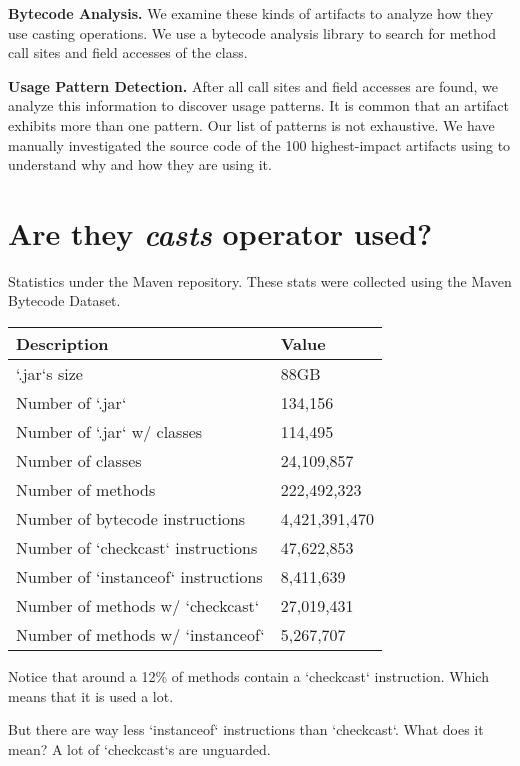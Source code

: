 \textbf{Bytecode Analysis.} 
We examine these kinds of artifacts to analyze how they use casting operations. 
We use a bytecode analysis library to search for method call sites and field accesses of the \smu{} class. 

\textbf{Usage Pattern Detection.} 
After all call sites and field accesses are found, we analyze this information to discover usage patterns. 
It is common that an artifact exhibits more than one pattern. 
Our list of patterns is not exhaustive.  
We have manually investigated the source code of the 100 highest-impact artifacts using \smu{} to understand why and how they are using it. 

\section{Are they \emph{casts} operator used? \label{orgb0b4e0e}}
\label{sec:orgb1d0eea}

Statistics under the Maven repository. 
These stats were collected using the Maven Bytecode Dataset. 

\begin{center}
\begin{tabular}{ll}
Description & Value\\
\hline
`.jar`s size & 88GB\\
Number of `.jar` & 134,156\\
Number of `.jar` w/ classes & 114,495\\
Number of classes & 24,109,857\\
Number of methods & 222,492,323\\
Number of bytecode instructions & 4,421,391,470\\
Number of `checkcast` instructions & 47,622,853\\
Number of `instanceof` instructions & 8,411,639\\
Number of methods w/ `checkcast` & 27,019,431\\
Number of methods w/ `instanceof` & 5,267,707\\
\end{tabular}
\end{center}

Notice that around a 12\% of methods contain a `checkcast` instruction. 
Which means that it is used a lot. 

But there are way less `instanceof` instructions than `checkcast`. 
What does it mean? 
A lot of `checkcast`s are unguarded. 

